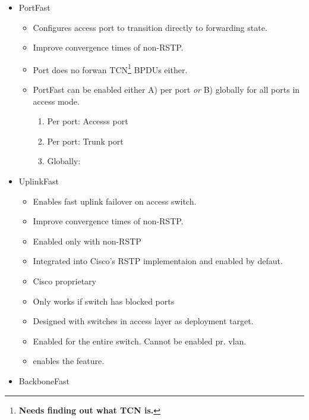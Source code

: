 \begin{itemize}
    \item PortFast
    \begin{itemize}
        \item Configures access port to transition directly to forwarding state.
        \item Improve convergence times of non-RSTP.
        \item Port does no forwan TCN\footnote{\textbf{Needs finding out what TCN is.}} BPDUs either.
        \item PortFast can be enabled either A) per port \textit{or} B) globally for all ports in access mode.
        \begin{enumerate}
            \item Per port: {\footnotesize Accesss port}\\
            \item Per port: {\footnotesize Trunk port}\\
            \item Globally:\\
        \end{enumerate}
    \end{itemize}
    \item UplinkFast
    \begin{itemize}
        \item Enables fast uplink failover on access switch.
        \item Improve convergence times of non-RSTP.
        \item Enabled only with non-RSTP
        \item Integrated into Cisco's RSTP implementaion and enabled by defaut.
        \item Cisco proprietary
        \item Only works if switch has blocked ports
        \item Designed with switches in access layer as deployment target.
        \item Enabled for the entire switch. Cannot be enabled pr. vlan.
        \item {} enables the feature.
    \end{itemize}
    \item BackboneFast

\end{itemize}
